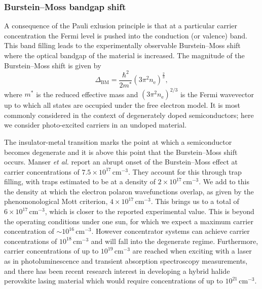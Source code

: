 \subsubsection{Burstein--Moss bandgap shift}

A consequence of the Pauli exlusion principle is that at a particular carrier concentration the Fermi level is pushed into the conduction (or valence) band. 
This band filling leads to the experimentally observable Burstein--Moss shift where the optical bandgap of the material is increased.
The magnitude of the Burstein--Moss shift is given by 
\begin{equation} \label{parabolic_shift}
\Delta_{\text{BM}} =\frac{\hbar^2}{2m^*}(3\pi^2n_{\text{e}})^{\frac{2}{3}},
\end{equation}
where $m^*$ is the reduced effective mass and $(3\pi^2n_{\text{e}})^{2/3}$ is the Fermi wavevector up to which all states are occupied under the free electron model. 
It is most commonly considered in the context of degenerately doped semiconductors; here we consider photo-excited carriers in an undoped material.

The insulator-metal transition marks the point at which a semiconductor becomes degenerate and it is above this point that the Burstein--Moss shift occurs.
Manser \textit{et al.} report an abrupt onset of the Burstein--Moss effect at carrier concentrations of $7.5\!\times\!10^{17}\,\mathrm{cm}^{-3}$.\autocite{Manser2014}
They account for this through trap filling, with traps estimated to be at a density of $2\!\times\!10^{17}\,\mathrm{cm}^{-3}$.
We add to this the density at which the electron polaron wavefunctions overlap, as given by the phenomonological Mott criterion\autocite{Mott1949}, $4\!\times\!10^{17}\,\mathrm{cm}^{-3}$.\autocite{Frost2017} 
This brings us to a total of $6\!\times\!10^{17}\,\mathrm{cm}^{-3}$, which is closer to the reported experimental value. 
This is beyond the operating conditions under one sun, for which we expect a maximum carrier concentration of $\sim10^{16}\,\mathrm{cm}^{-3}$.\autocite{Herz2016} 
However concentrator systems can achieve carrier concentrations of $10^{18}\,\mathrm{cm}^{-3}$ \autocite{Law2014} and will fall into the degenerate regime.
Furthermore, carrier concentrations of up to $10^{19}\,\mathrm{cm}^{-3}$ are reached when exciting with a laser as in photoluminescence and transient absorption spectroscopy measurements,\autocite{Richter2016}
and there has been recent research interest in developing a hybrid halide perovskite lasing material which would require concentrations of up to $10^{21}\,\mathrm{cm}^{-3}$.\autocite{Gao2017}

